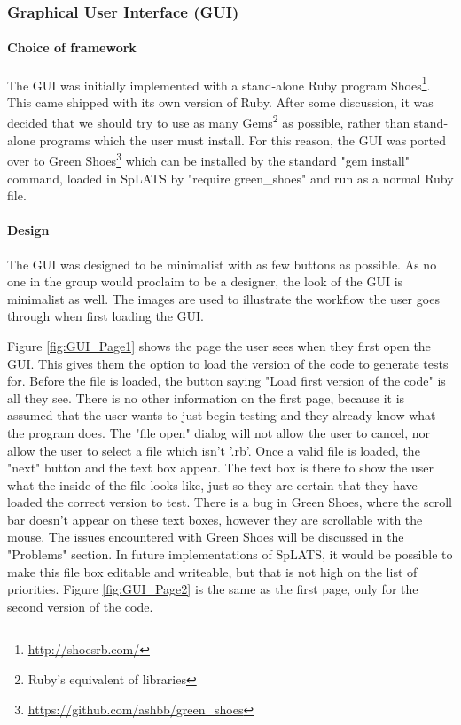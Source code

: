   \subsubsection{Graphical User Interface (GUI)}
  \paragraph{Choice of framework}
  The GUI was initially implemented with a stand-alone Ruby program Shoes\footnote{\url{http://shoesrb.com/}}. This came shipped with its own version of Ruby. After some discussion, it was decided that we should try to use as many Gems\footnote{Ruby's equivalent of libraries} as possible, rather than stand-alone programs which the user must install. For this reason, the GUI was ported over to Green Shoes\footnote{\url{https://github.com/ashbb/green_shoes}} which can be installed by the standard "gem install" command, loaded in SpLATS by "require green\_shoes" and run as a normal Ruby file.
  
  \paragraph{Design}
  The GUI was designed to be minimalist with as few buttons as possible. As no one in the group would proclaim to be a designer, the look of the GUI is minimalist as well. The images are used to illustrate the workflow the user goes through when first loading the GUI.
  
  Figure \ref{fig:GUI_Page1} shows the page the user sees when they first open the GUI. This gives them the option to load the version of the code to generate tests for. Before the file is loaded, the button saying "Load first version of the code" is all they see. There is no other information on the first page, because it is assumed that the user wants to just begin testing and they already know what the program does. The "file open" dialog will not allow the user to cancel, nor allow the user to select a file which isn't '.rb'. Once a valid file is loaded, the "next" button and the text box appear. The text box is there to show the user what the inside of the file looks like, just so they are certain that they have loaded the correct version to test. There is a bug in Green Shoes, where the scroll bar doesn't appear on these text boxes, however they are scrollable with the mouse. The issues encountered with Green Shoes will be discussed in the "Problems" section. In future implementations of SpLATS, it would be possible to make this file box editable and writeable, but that is not high on the list of priorities.
Figure \ref{fig:GUI_Page2} is the same as the first page, only for the second version of the code.
  
